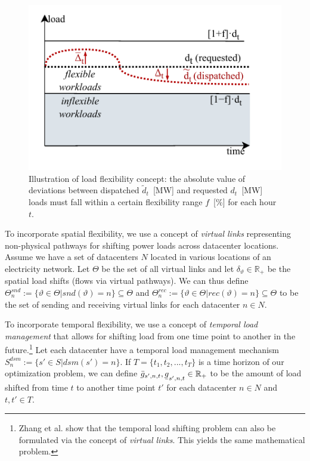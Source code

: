 \begin{figure}
    \centering
    \includegraphics[width=1\columnwidth]{img/flexibility.pdf}
    \caption{Illustration of load flexibility concept: the absolute value of deviations between dispatched $\widetilde{d}_t$~[MW] and requested $d_t$~[MW] loads must fall within a certain flexibility range $f$~[\%] for each hour $t$.}
    \label{fig:workloads}
\end{figure}


To incorporate spatial flexibility, we use a concept of \textit{virtual links} representing non-physical pathways for shifting power loads across datacenter locations. Assume we have a set of datacenters $N$ located in various locations of an electricity network. Let $\Theta$ be the set of all virtual links and let $\delta_\vartheta \in \mathbb{R}_{+}$ be the spatial load shifts (flows via virtual pathways). We can thus define $\Theta_n^{snd} := \{\vartheta \in \Theta | snd(\vartheta) = n\} \subseteq \Theta$ and $\Theta_n^{rec} := \{\vartheta \in \Theta | rec(\vartheta) = n\} \subseteq \Theta$ to be the set of sending and receiving virtual links for each datacenter $n \in N$.


To incorporate temporal flexibility, we use a concept of \textit{temporal load management} that allows for shifting load from one time point to another in the future.\footnote{Zhang et al. \cite{zhangRemuneratingSpaceTime2022} show that the temporal load shifting problem can also be formulated via the concept of \textit{virtual links}. This yields the same mathematical problem.} Let each datacenter have a temporal load management mechanism $S_n^{dsm} := \{s' \in S | dsm(s') = n\}$. If $T = \{t_1 , t_2 , ..., t_T\}$ is a time horizon of our optimization problem, we can define $\bar{g}_{s',n,t}, \ubar{g}_{s',n,t} \in \mathbb{R}_{+}$ to be the amount of load shifted from time $t$ to another time point $t'$ for each datacenter $n \in N$ and $t, t' \in T$.

